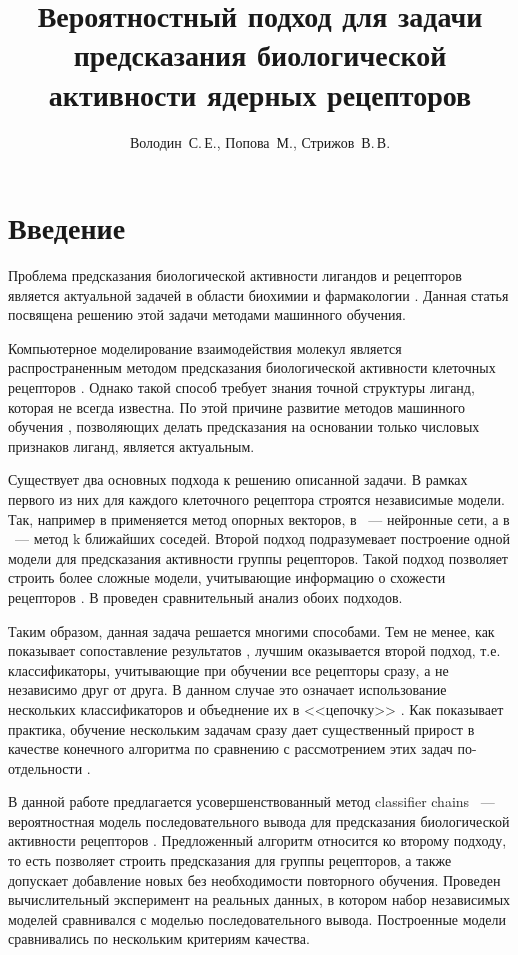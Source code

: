 \documentclass[12pt,twoside]{article}
\title
    [Предсказание биологической активности ядерных рецепторов] %
    {Вероятностный подход для задачи предсказания биологической активности ядерных рецепторов}
\author
    [Володин~С.\,Е.] %
    {Володин~С.\,Е., Попова~М., Стрижов~В.\,В.} %
    [Володин~С.\,Е., Попова~М., Стрижов~В.\,В.] %
\begin{document}
\maketitle
\section{Введение}
Проблема предсказания биологической активности лигандов и рецепторов является актуальной задачей в области биохимии и фармакологии \cite{hornak, Myint2012, Myint2015, vinay2008, Zhengjun5ht1a, laurent2008}. Данная статья посвящена решению этой задачи методами машинного обучения.

Компьютерное моделирование взаимодействия молекул является распространенным методом предсказания биологической активности клеточных рецепторов \cite{vinay2008, hornak}. Однако такой способ требует знания точной структуры лиганд, которая не всегда известна. По этой причине развитие методов машинного обучения \cite{peter1998}, позволяющих делать предсказания на основании только числовых признаков лиганд, является актуальным.

Существует два основных подхода к решению описанной задачи. В рамках первого из них для каждого клеточного рецептора строятся независимые модели. Так, например в \cite{svm, Zhengjun5ht1a} применяется метод опорных векторов, в \cite{Myint2012, Myint2015}~--- нейронные сети, а в \cite{scott2006}~--- метод k ближайших соседей. Второй подход подразумевает построение одной модели для предсказания активности группы рецепторов. Такой подход позволяет строить более сложные модели, учитывающие информацию о схожести рецепторов \cite{laurent2008}. В \cite{popova1} проведен сравнительный анализ обоих подходов.

Таким образом, данная задача решается многими способами. Тем не менее, как показывает сопоставление результатов \cite{popova1}, лучшим оказывается второй подход, т.е. классификаторы, учитывающие при обучении все рецепторы сразу, а не независимо друг от друга. В данном случае это означает использование нескольких классификаторов и объеднение их в <<цепочку>> \cite{elena, weiweicc, jesse}. Как показывает практика, обучение нескольким задачам сразу дает существенный прирост в качестве конечного алгоритма по сравнению с рассмотрением этих задач по-отдельности \cite{weiwei2010, maxime2015, jesse}.

В данной работе предлагается усовершенствованный метод classifier chains \cite{jesse}~--- вероятностная модель последовательного вывода для предсказания биологической активности рецепторов \cite{enrique, weiwei2010}. Предложенный алгоритм относится ко второму подходу, то есть позволяет строить предсказания для группы рецепторов, а также допускает добавление новых без необходимости повторного обучения. Проведен вычислительный эксперимент на реальных данных, в котором набор независимых моделей сравнивался с моделью последовательного вывода. Построенные модели сравнивались по нескольким критериям качества.
\end{document}

